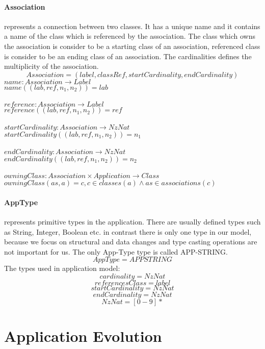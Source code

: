 \documentclass[11pt]{article}
\begin{document}
\paragraph {Association} represents a connection between two classes. It has a unique name and it contains a name of the class which is referenced by the association. The class which owns the association is consider to be a starting class of an association, referenced class is consider to be an ending class of an association. The cardinalities defines the multiplicity of the association.
$$
Association = (label, classRef, startCardinality, endCardinality)
$$
$name : Association \rightarrow Label$ \\
$name((lab, ref, n_1, n_2)) = lab$\\ \\
$reference : Association \rightarrow Label$ \\
$reference((lab, ref, n_1, n_2)) = ref$\\ \\
$startCardinality : Association \rightarrow NzNat$ \\
$startCardinality((lab, ref, n_1, n_2)) = n_1$\\ \\
$endCardinality : Association \rightarrow NzNat$ \\
$endCardinality((lab, ref, n_1, n_2)) = n_2$ \\ \\
$owningClass : Association \times Application \rightarrow Class $ \\
$owningClass(as, a) = c, c \in classes(a) \wedge as \in associations(c) $

\paragraph{AppType} represents primitive types in the application. There are usually defined types such as String, Integer, Boolean etc. in contrast there is only one type in our model, because we focus on structural and data changes and type casting operations are not important for us. The only App-Type type is called APP-STRING.
$$
AppType = APPSTRING
$$
The types used in application model:
$$
cardinality = NzNat
$$
$$
referencesClass = label
$$
$$
startCardinality = NzNat
$$
$$
endCardinality = NzNat
$$
$$
NzNat = [0 - 9]*
$$




\section{Application Evolution}
\label{sec:appEvolution}
\end{document}
